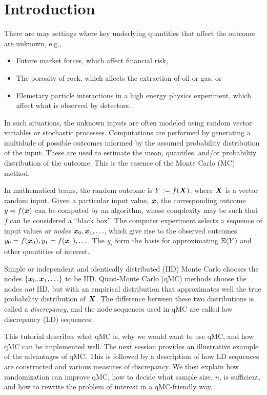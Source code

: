 \documentclass{svproc}
\newcounter{algorithm}%
\begin{document}
\section{Introduction} \label{sec:intro}
There are may settings where key underlying quantities that affect the outcome are unknown, e.g.,
\begin{itemize}
	\item Future market forces, which affect financial risk,
	\item The porosity of rock, which affects the extraction of oil or gas, or
	\item Elemetary particle interactions in a high energy physics experiment, which affect what is observed by detectors.
\end{itemize}
In such situations, the unknown inputs are often modeled using random vector variables or stochastic processes.  Computations are performed by generating a multidude of possible outcomes informed by the assumed probability distribution of the input. These are used to estimate the mean, quantiles, and/or probability distribution of the outcome.  This is the essence of the Monte Carlo (MC) method.

In mathematical terms, the random outcome is $Y := f({\boldsymbol{X}})$, where ${\boldsymbol{X}}$ is a vector random input.  Given a particular input value, ${\boldsymbol{x}}$, the corresponding outcome  $y = f({\boldsymbol{x}})$ can be computed by an algorithm, whose complexity may be such that $f$ can be considered a ``black box''.  The computer experiment selects a sequence of input values or \emph{nodes} ${\boldsymbol{x}}_0, {\boldsymbol{x}}_1, \ldots$, which give rise to the observed outcomes $y_0 = f({\boldsymbol{x}}_0), y_1 = f({\boldsymbol{x}}_1), \ldots$.  The $y_i$ form the basis for approximating ${\mathbb{E}}(Y)$ and other quantities of interest.

Simple or independent and identically distributed (IID)  Monte Carlo chooses the nodes $\{{\boldsymbol{x}}_0, {\boldsymbol{x}}_1, \ldots\}$ to be IID.  Quasi-Monte Carlo (qMC) methods choose the nodes \emph{not} IID, but with an empirical distribution that approximates well the true probability distribution of ${\boldsymbol{X}}$.  The difference between these two distributions is called a \emph{discrepancy}, and the node sequences used in qMC are called low discrepancy (LD) sequences.

This tutorial describes what qMC is, why we would want to use qMC, and how qMC can be implemented well.  The next session provides an illustrative example of the advantages of qMC.  This is followed by a description of how LD sequences are constructed and various measures of discrepancy.  We then explain how randomization can improve qMC, how to decide what sample size, $n$, is sufficient, and how to rewrite the problem of interest in a qMC-friendly way.
\end{document}
